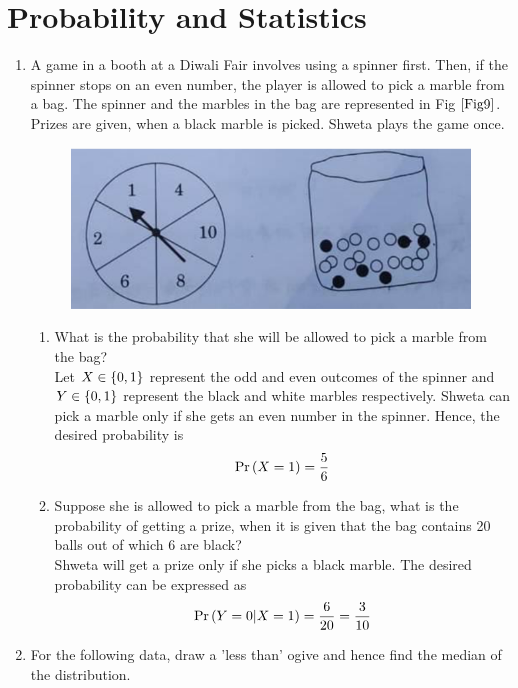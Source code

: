 \documentclass[journal,12pt,twocolumn]{IEEEtran}
\begin{document}
\section{Probability and Statistics}
\begin{enumerate}
    \item A game in a booth at a Diwali Fair involves using a spinner first. Then, if the spinner stops on an even number, the player is allowed to pick a marble from a bag. The spinner and the marbles in the bag are represented in Fig $\ref{Fig9}$.\\
    Prizes are given, when a black marble is picked. Shweta plays the game once.
    \begin{figure}[h!]
        \centering
        \includegraphics[width=0.5\columnwidth]{Fig9.png}
	    \caption{}
	    \label{Fig9}
    \end{figure} 
    \begin{enumerate}
        \item What is the probability that she will be allowed to pick a marble from the bag?\\
		\solution Let $X\in \left\{0,1\right\}$ represent the odd and even outcomes of the spinner and $Y \in \left\{0,1\right\}$ represent the black and white marbles respectively.  Shweta can pick a marble only if she gets an even number in the spinner.  Hence, the desired probability is 
		    \begin{align}
			    \Pr\left(X = 1\right) = \frac{5}{6}
		    \end{align}
        \item Suppose she is allowed to pick a marble from the bag, what is the probability of getting a prize, when it is given that the bag contains 20 balls out of which 6 are black?\\
		\solution Shweta will get a prize only if she picks a black marble.  The desired probability can be expressed as 
		    \begin{align}
			    \Pr\left(Y = 0 | X = 1\right) = \frac{6}{20} = \frac{3}{10}
		    \end{align}
    \end{enumerate}
        \item For the following data, draw a 'less than' ogive and hence find the median of the distribution.\\

\end{enumerate}
\end{document}
